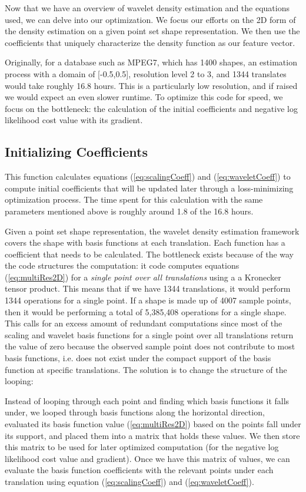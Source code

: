\documentclass[../tech_report_1.tex]{subfiles}
\begin{document}
Now that we have an overview of wavelet density estimation and the
equations used, we can delve into our optimization. We focus our efforts on the 2D form of the density estimation on a given point set shape representation.
We then use the coefficients that uniquely characterize the density
function as our feature vector. 

Originally, for a database such as
MPEG7, which has 1400 shapes, an estimation process with a domain of {[}-0.5,0.5{]}, resolution
level 2 to 3, and 1344 translates would take roughly 16.8 hours.
This is a particularly low resolution, and if raised we would expect
an even slower runtime. To optimize this code for speed, we focus on the
bottleneck: the calculation of the initial coefficients and negative
log likelihood cost value with its gradient. 


\subsection*{Initializing Coefficients}

This function calculates equations (\ref{eq:scalingCoeff})
and (\ref{eq:waveletCoeff}) to compute initial coefficients
that will be updated later through a loss-minimizing optimization process.
The time spent for this calculation with the same parameters mentioned
above is roughly around 1.8 of the 16.8 hours. 

Given a point set shape representation, the wavelet density estimation framework covers the
shape with basis functions at each translation. Each function has
a coefficient that needs to be calculated. The bottleneck exists because of the way the code structures the computation: it
code computes equations (\ref{eq:multiRes2D}) for a \emph{single
point over all translations} using a a Kronecker
tensor product.
 This means that if we have 1344 translations,
it would perform 1344 operations for a single point. If a shape is made up of 4007 sample
points, then it would be performing a total of 5,385,408 operations
for a single shape. This calls for an excess amount of redundant computations
since most of the scaling and wavelet basis functions for a single
point over all translations return the value of zero because the observed sample point does not contribute
to most basis functions, i.e. does not exist under the compact support
of the basis function at specific translations. The solution is to change the structure of the looping: 

Instead of looping through each point and finding which basis functions
it falls under, we looped through basis functions along the horizontal
direction, evaluated its basis function value (\ref{eq:multiRes2D})
based on the points fall under its support, and placed them into a
matrix that holds these values. We then store this matrix to be used
for later optimized computation (for the negative log likelihood cost
value and gradient). Once we have this matrix of values, we can evaluate the basis function coefficients with the relevant points
under each translation using equation (\ref{eq:scalingCoeff}) and
(\ref{eq:waveletCoeff}). 
\end{document}
